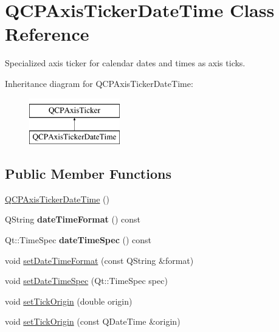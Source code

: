 \hypertarget{class_q_c_p_axis_ticker_date_time}{}\section{Q\+C\+P\+Axis\+Ticker\+Date\+Time Class Reference}
\label{class_q_c_p_axis_ticker_date_time}


Specialized axis ticker for calendar dates and times as axis ticks.  


Inheritance diagram for Q\+C\+P\+Axis\+Ticker\+Date\+Time\+:\begin{figure}[H]
\begin{center}
\leavevmode
\includegraphics[height=2.000000cm]{class_q_c_p_axis_ticker_date_time}
\end{center}
\end{figure}
\subsection*{Public Member Functions}
\begin{DoxyCompactItemize}
\item 
\hyperlink{class_q_c_p_axis_ticker_date_time_a84cc5c6bbc7c99c1f9bd4b3a392e1b9d}{Q\+C\+P\+Axis\+Ticker\+Date\+Time} ()
\item 
\mbox{\label{class_q_c_p_axis_ticker_date_time_aac8e2bb32ca8ff1394c42d2d62390718}} 
Q\+String {\bfseries date\+Time\+Format} () const
\item 
\mbox{\label{class_q_c_p_axis_ticker_date_time_ae688e69ba55c9247af26b6db85cf9573}} 
Qt\+::\+Time\+Spec {\bfseries date\+Time\+Spec} () const
\item 
void \hyperlink{class_q_c_p_axis_ticker_date_time_ad52660a82f688395468674d555f6a86b}{set\+Date\+Time\+Format} (const Q\+String \&format)
\item 
void \hyperlink{class_q_c_p_axis_ticker_date_time_afbd987c7197e42ab61e67fb1c38abebc}{set\+Date\+Time\+Spec} (Qt\+::\+Time\+Spec spec)
\item 
void \hyperlink{class_q_c_p_axis_ticker_date_time_a5388e048cbd32cf1ba730b9f1859eb5c}{set\+Tick\+Origin} (double origin)
\item 
void \hyperlink{class_q_c_p_axis_ticker_date_time_a2ea905872b8171847a49a5e093fb0c48}{set\+Tick\+Origin} (const Q\+Date\+Time \&origin)
\end{DoxyCompactItemize}

